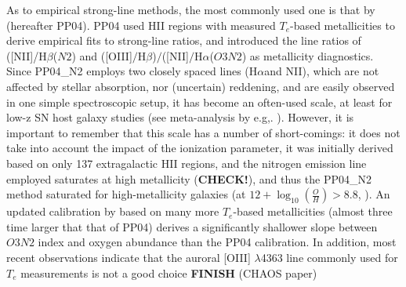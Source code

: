 \documentclass{emulateapj}
\newcommand{\oxab}{\ensuremath{12 + \log_{10}(\frac{O}{H})}}
\newcommand{\ha}{H$\alpha$}
\newcommand{\hb}{H$\beta$}
\begin{document}
As to empirical strong-line methods, the most commonly used one is that by \citet{pettini04} (hereafter PP04). PP04 used HII regions with measured $T_e$-based metallicities to derive empirical fits to strong-line ratios, and introduced the line ratios of ([NII]/\hb ($N2$) and ([OIII]$/$\hb)$/$([NII]$/$\ha ($O3N2$) as metallicity diagnostics. Since PP04\_N2 employs two closely spaced lines (\ha and NII), which are not affected by stellar absorption, nor (uncertain) reddening, and are easily observed in one simple spectroscopic setup, it has become an often-used scale, at least for low-z SN host galaxy studies (see meta-analysis by e.g,. \citealt{sanders12,modjaz12_proc,leloudas14}). However, it is important to remember that this scale has a number of short-comings: it does not take into account the impact of the ionization parameter, it was initially derived based on only 137 extragalactic HII regions, and the nitrogen emission line employed saturates at high metallicity (\textbf{CHECK!}), and thus 
the PP04\_N2 method saturated for high-metallicity galaxies (at $\oxab > 8.8$, \citealt{kewley08}). An updated calibration by \citet{marino13} based on many more $T_e$-based metallicities (almost three time larger that that of PP04) derives a significantly shallower slope between $O3N2$ index and oxygen abundance than the PP04 calibration. In addition, most recent observations indicate that the auroral [OIII] $\lambda$4363 line commonly used for $T_e$ measurements is not a good choice \textbf{FINISH} (CHAOS paper) 


\end{document}
